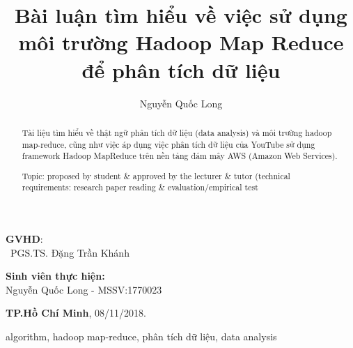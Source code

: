 \documentclass{hcmutarticle}
\begin{document}
	\vspace{2cm}
	
	\begin{minipage}[t]{0.60\linewidth}
		\textbf{GVHD}: \\
		\ PGS.TS. Đặng Trần Khánh
	\end{minipage}
	\begin{minipage}[t]{0.40\linewidth}
		\textbf{Sinh viên thực hiện:}\\
		Nguyễn Quốc Long - MSSV:1770023
	\end{minipage}
	
	\vspace{4cm}
	
	\begin{center}
		
		\textbf{TP.Hồ Chí Minh},
		08/11/2018.
		
	\end{center}
	
	
	
	\newpage
	
	\tableofcontents 
	
	\newpage
	
	\title{Bài luận tìm hiểu về việc sử dụng môi trường Hadoop Map Reduce để phân tích dữ liệu }
	
	\author{  Nguyễn Quốc Long} 
	
	
	
	
	
	\maketitle
	
	
	\begin{abstract}
		Tài liệu tìm hiểu về thật ngữ phân tích dữ liệu (data analysis) và môi trường hadoop map-reduce, cũng như việc áp dụng việc phân tích dữ liệu của YouTube sử dụng framework Hadoop MapReduce trên nền tảng đám mây AWS (Amazon Web Services).
		
		Topic: proposed by student \& approved by the lecturer \& tutor (technical requirements: research paper reading \& evaluation/empirical test
	\end{abstract}
	
	\begin{keywords}
		algorithm, hadoop map-reduce, phân tích dữ liệu, data analysis
	\end{keywords} 
	
\end{document}

